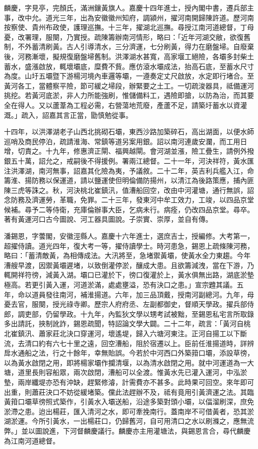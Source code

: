 \begin{pinyinscope}
麟慶，字見亭，完顏氏，滿洲鑲黃旗人。嘉慶十四年進士，授內閣中書，遷兵部主事，改中允。道光三年，出為安徽徽州知府，調潁州，擢河南開歸陳許道。歷河南按察使、貴州布政使，護理巡撫。十三年，擢湖北巡撫。尋授江南河道總督，丁母憂，改署理，服闋，乃實授。疏陳籌辦南河情形，略曰：「近年河湖交敝，欲復舊制，不外蓄清刷黃。古人引導清水，三分濟運，七分刷黃，得力在磨盤埽。自廢棄後，河務漸壞，擬規復磨盤埽舊制。洪澤湖水甚寬，高家堰工絕險，各壩多封柴土蓄水，盛漲啟放，輒壞壩底，糜費不貲。應仿滾水壩成法，抬高石底，至蓄水尺寸為度。山圩五壩暨下游楊河境內車邏等壩，一遵奏定丈尺啟放，水定即行堵合。至黃河各工，當體察平險，節可緩之埽段，辦緊要之土工。一切疏浚器具，祗備運河挑挖。若黃河底淤，非人力所能強刷，惟儲備料工，遇險即搶，以防為治，而其要全在得人。又以蘆葦為工程必需，右營蕩地荒廢，產蘆不足，請築圩蓄水以資灌溉。」疏入，詔嘉其言正當，勖慎勉從事。

十四年，以洪澤湖老子山西北挑砌石壩，東西沙路加築碎石，高出湖面，以便水師巡哨及商民停泊，疏請淮海、常鎮等道另案用銀。詔以南河連歲安瀾，而工用日增，切責之。十九年，修惠濟正閘、福興越閘。會河湖並漲，險工疊生，請例外撥銀五十萬，詔允之，戒嗣後不得援例。署兩江總督。二十一年，河決祥符，黃水匯注洪澤湖，南河無事，詔嘉其化險為夷，予議敘。二十二年，英吉利兵艦入江，命籌淮、揚防務以保運道，請以鹽運使但明倫備防揚州，以清江為後路策應，捕內匪陳三虎等誅之。秋，河決桃北崔鎮汛，值漕船回空，改由中河灌塘，通行無誤，詔念防務及濟運勞，革職，免罪。二十三年，發東河中牟工效力，工竣，以四品京堂候補。尋予二等侍衛，充庫倫辦事大臣，乞病未行。病痊，仍改四品京堂。尋卒。著有黃運河口古今圖說、河工器具圖說。子崇實、崇厚，並自有傳。

潘錫恩，字蕓閣，安徽涇縣人。嘉慶十六年進士，選庶吉士，授編修。大考第一，超擢侍讀。道光四年，復大考一等，擢侍讀學士。時河患急，錫恩上疏條陳河務，略曰：「蓄清敵黃，為相傳成法。大汛將至，急堵禦黃壩，使黃水全力東趨。今年漕艘早渡，因禦黃壩遲堵，以致倒灌停淤，釀成大患。且欲籌減洩，當在下游，乃輒開祥符徬，減黃入湖。壩口已灌於下，徬口復灌於上，黃水俱無出路，湖底淤墊極高。若更引黃入運，河道淤滿，處處壅溢，恐有決口之患。」宣宗韙其議。五年，命以道員發往南河，補淮揚道。六年，加三品頂戴，授南河副總河。九年，母憂去官，服闋，授光祿寺卿。歷宗人府府丞、左副都御史，督順天學政。擢兵部侍郎，調吏部，仍留學政。十九年，內監狄文學以甥考試被黜，至錫恩私宅言所取錄多出請託，挾制訛詐，錫恩疏聞，特詔論文學大闢。二十二年，疏言：「黃河自桃北崔鎮汛、蕭家莊北決口穿運河，壞遙堤，歸入六塘河東注。正河自揚工以下斷流，去清口約有六七十里之遠，回空漕船，阻於宿遷以上。臣前任淮揚道時，詳辨戽水通船之法，行之十餘年，幸無貽誤。今若於中河西口外築箝口壩，添設草徬，以為黃水啟閉之用，即將楊家壩作攔清堰，以為清水啟閉之用。就中河運道為一大塘，道里長則容船眾，兩次啟閉，漕船可以全渡。惟黃水先已灌入運河，中泓淤墊，兩岸纖堤亦恐有沖缺，趕緊修濬，計需費亦不甚多。此時果可回空。來年即可出重，則蕭莊決口不妨從緩堵築。儻此法趕辦不及，祗有竟用引黃濟運之法。其臨黃箝口壩草徬照式築作，引黃水入壩送船，沿途多築對頭小壩，以偪溜刷深，庶免淤滯之患。迨出楊莊，匯入清河之水，即可牽挽南行。蓋南岸不可借黃者，恐其淤湖淤運。今所引黃水，一出楊莊口，仍歸舊河，自可用清口之水以刷滌之，應無流弊。」並以圖說進，下河督麟慶議行。麟慶亦主用灌塘法，與錫恩言合，尋代麟慶為江南河道總督。


\end{pinyinscope}
